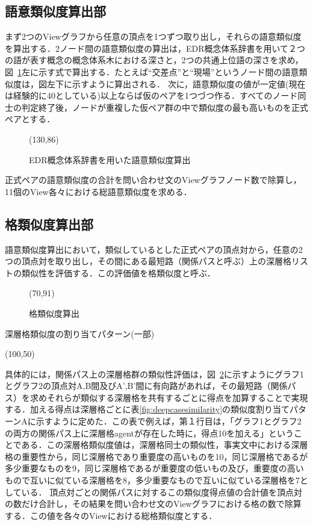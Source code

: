 \subsection{語意類似度算出部}
まず2つのViewグラフから任意の頂点を1つずつ取り出し，それらの語意類似度を算出する．2ノード間の語意類似度の算出は，EDR概念体系辞書を用いて２つの語が表す概念の概念体系木における深さと，2つの共通上位語の深さを求め，図~\ref{fig:wordsimilarity}左に示す式で算出する．たとえば``交差点''と``現場''というノード間の語意類似度は，図左下に示すように算出される．
次に，語意類似度の値が一定値(現在は経験的に40としている)以上ならば仮のペアを1つづつ作る．すべてのノード同士の判定終了後，ノードが重複した仮ペア群の中で類似度の最も高いものを正式ペアとする．


\begin{figure}
\begin{center}
 \atari(130,86)
 \caption{EDR概念体系辞書を用いた語意類似度算出}
 \label{fig:wordsimilarity}
\end{center}
\end{figure}

正式ペアの語意類似度の合計を問い合わせ文のViewグラフノード数で除算し，11個のView各々における総語意類似度を求める．

\subsection{格類似度算出部}
語意類似度算出において，類似しているとした正式ペアの頂点対から，任意の2つの頂点対を取り出し，その間にある最短路（関係パスと呼ぶ）上の深層格リストの類似性を評価する．この評価値を格類似度と呼ぶ．

\begin{figure}
\begin{center}
 \atari(70,91)
 \caption{格類似度算出}
 \label{fig:casesimilarity}
\end{center}
\end{figure}

\begin{table}
\begin{center}
 \caption{深層格類似度の割り当てパターン(一部)}
 \atari(100,50)
 \label{fig:deepcasesimilarity}
\end{center}
\end{table}


具体的には，関係パス上の深層格群の類似性評価は，図~\ref{fig:casesimilarity}に示すようにグラフ1とグラフ2の頂点対A,B間及びA',B'間に有向路があれば，その最短路（関係パス）を求めそれらが類似する深層格を共有するごとに得点を加算することで実現する．加える得点は深層格ごとに表\ref{fig:deepcasesimilarity}の類似度割り当てパターンAに示すように定めた．この表で例えば，第１行目は，「グラフ1とグラフ2の両方の関係パス上に深層格agentが存在した時に，得点10を加える」ということである．この深層格類似度値は，深層格同士の類似性，事実文中における深層格の重要性から，同じ深層格であり重要度の高いものを10，同じ深層格であるが多少重要なものを9，同じ深層格であるが重要度の低いもの及び，重要度の高いもので互いに似ている深層格を8，多少重要なもので互いに似ている深層格を7としている．
頂点対ごとの関係パスに対するこの類似度得点値の合計値を頂点対の数だけ合計し，その結果を問い合わせ文のViewグラフにおける格の数で除算する．この値を各々のViewにおける総格類似度とする．

